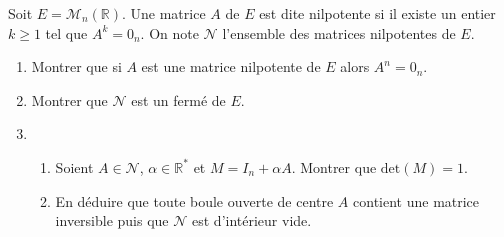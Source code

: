\documentclass[a4paper,10pt]{report}
\begin{document}
\begin{Exa} Soit $E= \mathcal{M}_n(\mathbb{R})$. Une matrice $A$ de $E$ est dite nilpotente si il existe un entier $k\geq 1$ tel que $A^k = 0_n$. On note $\mathcal{N}$ l'ensemble des matrices nilpotentes de $E$.

\begin{enumerate}
\item Montrer que si $A$ est une matrice nilpotente de $E$ alors $A^n=0_n$.
\item Montrer que $\mathcal{N}$ est un fermé de $E$.
\item 
\begin{enumerate}
\item Soient $A \in \mathcal{N}$, $\alpha \in \mathbb{R}^*$ et $M=I_n+ \alpha A$. Montrer que $\textrm{det}(M)=1$.
\item En déduire que toute boule ouverte de centre $A$ contient une matrice inversible puis que $\mathcal{N}$ est d'intérieur vide.
\end{enumerate}
\end{enumerate}
\end{Exa}

\corr 
\end{document}
